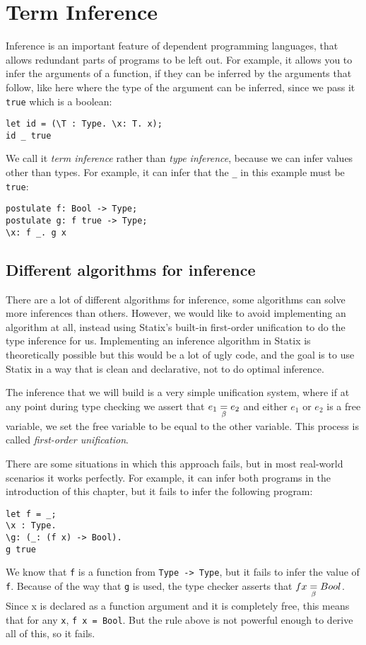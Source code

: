 \chapter{Term Inference}

Inference is an important feature of dependent programming languages, that allows redundant parts of programs to be left out. For example, it allows you to infer the arguments of a function, if they can be inferred by the arguments that follow, like here where the type of the argument can be inferred, since we pass it \verb|true| which is a boolean:
\begin{lstlisting}
let id = (\T : Type. \x: T. x);
id _ true
\end{lstlisting}

We call it \emph{term inference} rather than \emph{type inference}, because we can infer values other than types. For example, it can infer that the \verb|_| in this example must be \verb|true|:
\begin{lstlisting}
postulate f: Bool -> Type;
postulate g: f true -> Type;
\x: f _. g x
\end{lstlisting}

\section{Different algorithms for inference}
\label{strength-inference}

There are a lot of different algorithms for inference\cite{typeinference}, some algorithms can solve more inferences than others. However, we would like to avoid implementing an algorithm at all, instead using Statix's built-in first-order unification to do the type inference for us. Implementing an inference algorithm in Statix is theoretically possible but this would be a lot of ugly code, and the goal is to use Statix in a way that is clean and declarative, not to do optimal inference.

The inference that we will build is a very simple unification system, where if at any point during type checking we assert that $e_1 \underset{\beta}{=} e_2$ and either $e_1$ or $e_2$ is a free variable, we set the free variable to be equal to the other variable. This process is called \emph{first-order unification}.

There are some situations in which this approach fails, but in most real-world scenarios it works perfectly. For example, it can infer both programs in the introduction of this chapter, but it fails to infer the following program:
\begin{lstlisting}
let f = _;
\x : Type.
\g: (_: (f x) -> Bool).
g true
\end{lstlisting}
We know that \verb|f| is a function from \verb|Type -> Type|, but it fails to infer the value of \verb|f|. Because of the way that \verb|g| is used, the type checker asserts that $f x \underset{\beta}{=} Bool$. Since x is declared as a function argument and it is completely free, this means that for any \verb|x|, \verb|f x = Bool|. But the rule above is not powerful enough to derive all of this, so it fails.

